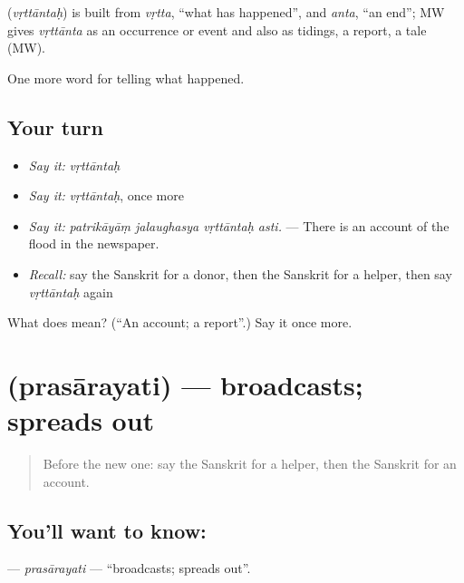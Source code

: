\begin{cousinweb}
\textbf{} (\emph{vṛttāntaḥ}) is built from \emph{vṛtta}, \textquotedblleft{}what has happened\textquotedblright{}, and \emph{anta}, \textquotedblleft{}an end\textquotedblright{}; MW gives \emph{vṛttānta} as an occurrence or event and also as tidings, a report, a tale (MW).
\end{cousinweb}

\begin{grammarlens}[title={What you've built}]
One more word for telling what happened.
\end{grammarlens}

\subsection*{Your turn}
\begin{itemize}
\raggedright
  \item \emph{Say it:} \emph{vṛttāntaḥ}
  \item \emph{Say it:} \emph{vṛttāntaḥ}, once more
  \item \emph{Say it:} \emph{patrikāyāṃ jalaughasya vṛttāntaḥ asti.} — There is an account of the flood in the newspaper.
  \item \emph{Recall:} say the Sanskrit for a donor, then the Sanskrit for a helper, then say \emph{vṛttāntaḥ} again
\end{itemize}

\begin{tcolorbox}[breakable,colback=teal!4,colframe=teal!35!black,title={Before you move on}]
What does  mean? (\textquotedblleft{}An account; a report\textquotedblright{}.) Say it once more.
\end{tcolorbox}
\section[\texorpdfstring{\sk{प्रसारयति} (prasārayati)}{प्रसारयति (prasārayati)}]{ (prasārayati) — broadcasts; spreads out}

\label{lesson:SA-C309-prasarayati}



\begin{quote}
Before the new one: say the Sanskrit for a helper, then the Sanskrit for an account.
\end{quote}

\subsection*{You'll want to know: }
\textbf{} — \emph{prasārayati} — \textquotedblleft{}broadcasts; spreads out\textquotedblright{}.

